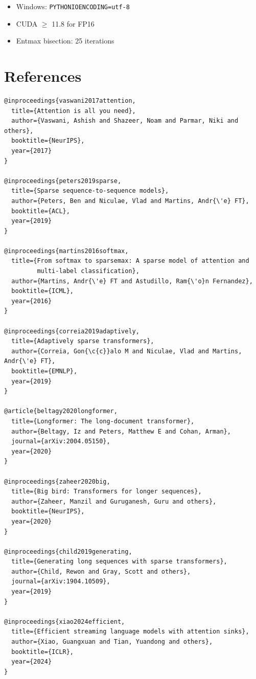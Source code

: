 \begin{itemize}
\item Windows: \texttt{PYTHONIOENCODING=utf-8}
\item CUDA $\ge$ 11.8 for FP16
\item Entmax bisection: 25 iterations
\end{itemize}


\section{References}

\begin{lstlisting}
@inproceedings{vaswani2017attention,
  title={Attention is all you need},
  author={Vaswani, Ashish and Shazeer, Noam and Parmar, Niki and others},
  booktitle={NeurIPS},
  year={2017}
}

@inproceedings{peters2019sparse,
  title={Sparse sequence-to-sequence models},
  author={Peters, Ben and Niculae, Vlad and Martins, Andr{\'e} FT},
  booktitle={ACL},
  year={2019}
}

@inproceedings{martins2016softmax,
  title={From softmax to sparsemax: A sparse model of attention and 
         multi-label classification},
  author={Martins, Andr{\'e} FT and Astudillo, Ram{\'o}n Fernandez},
  booktitle={ICML},
  year={2016}
}

@inproceedings{correia2019adaptively,
  title={Adaptively sparse transformers},
  author={Correia, Gon{\c{c}}alo M and Niculae, Vlad and Martins, Andr{\'e} FT},
  booktitle={EMNLP},
  year={2019}
}

@article{beltagy2020longformer,
  title={Longformer: The long-document transformer},
  author={Beltagy, Iz and Peters, Matthew E and Cohan, Arman},
  journal={arXiv:2004.05150},
  year={2020}
}

@inproceedings{zaheer2020big,
  title={Big bird: Transformers for longer sequences},
  author={Zaheer, Manzil and Guruganesh, Guru and others},
  booktitle={NeurIPS},
  year={2020}
}

@inproceedings{child2019generating,
  title={Generating long sequences with sparse transformers},
  author={Child, Rewon and Gray, Scott and others},
  journal={arXiv:1904.10509},
  year={2019}
}

@inproceedings{xiao2024efficient,
  title={Efficient streaming language models with attention sinks},
  author={Xiao, Guangxuan and Tian, Yuandong and others},
  booktitle={ICLR},
  year={2024}
}


\end{lstlisting}
